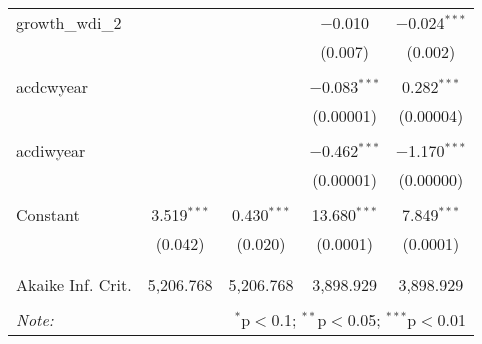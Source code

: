 \begin{table}[!htbp]
\begin{tabular}{@{\extracolsep{5pt}}lcccc}
 growth\_wdi\_2 &  &  & $-$0.010 & $-$0.024$^{***}$ \\ 
  &  &  & (0.007) & (0.002) \\ 
  & & & & \\ 
 acdcwyear &  &  & $-$0.083$^{***}$ & 0.282$^{***}$ \\ 
  &  &  & (0.00001) & (0.00004) \\ 
  & & & & \\ 
 acdiwyear &  &  & $-$0.462$^{***}$ & $-$1.170$^{***}$ \\ 
  &  &  & (0.00001) & (0.00000) \\ 
  & & & & \\ 
 Constant & 3.519$^{***}$ & 0.430$^{***}$ & 13.680$^{***}$ & 7.849$^{***}$ \\ 
  & (0.042) & (0.020) & (0.0001) & (0.0001) \\ 
  & & & & \\ 
\hline \\[-1.8ex] 
Akaike Inf. Crit. & 5,206.768 & 5,206.768 & 3,898.929 & 3,898.929 \\ 
\hline 
\hline \\[-1.8ex] 
\textit{Note:}  & \multicolumn{4}{r}{$^{*}$p$<$0.1; $^{**}$p$<$0.05; $^{***}$p$<$0.01} \\ 
\end{tabular} 
\end{table} 

